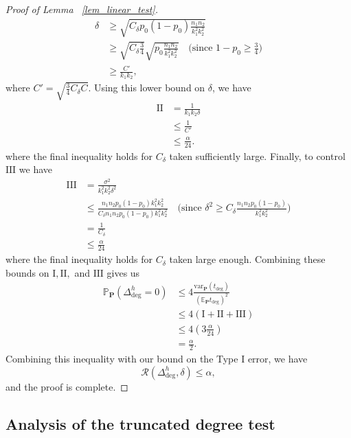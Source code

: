 \documentclass{article}
\newcommand{\bbP}{\mathbb{P}}
\newcommand{\bP}{\mathbf{P}}
\newcommand{\cR}{\mathcal{R}}
\newcommand{\EE}{\mathbb{E}}
\newcommand{\var}{\textrm{var}}
\newcommand{\lin}{\text{deg}}
\begin{document}
\begin{proof}[Proof of Lemma ~\ref{lem_linear_test}]
\begin{align*}
    \delta &\geq \sqrt{C_\delta p_0 (1 - p_0)\frac{n_1n_2}{k_1^2k_2^2}} \\
    &\geq \sqrt{C_\delta \frac 34}\sqrt{p_0\frac{n_1n_2}{k_1^2k_2^2}} \quad \text{(since $1 - p_0 \geq \frac34$)} \\
    &\geq \frac{C'}{k_1k_2},
\end{align*}
where $C' = \sqrt{\frac 34 C_\delta C}$. Using this lower bound on $\delta$, we have
\begin{align*}
    \text{II} &= \frac{1}{k_1k_2\delta} \\
    &\leq \frac{1}{C'} \\
    &\leq \frac{\alpha}{24}.
\end{align*}
where the final inequality holds for $C_\delta$ taken sufficiently large. Finally, to control $\text{III}$ we have
\begin{align*}
    \text{III} &= \frac{\sigma^2}{k^2_1k^2_2 \delta^2} \\
    &\leq \frac{n_1n_2p_0(1- p_0)k_1^2k_2^2}{C_\delta n_1n_2p_0(1- p_0)k_1^2k_2^2} \quad \text{(since $\delta^2 \geq C_\delta\frac{n_1n_2p_0(1 - p_0)}{k^2_1k^2_2}$)}\\
    &= \frac{1}{C_\delta} \\
    &\leq \frac{\alpha}{24}
\end{align*}
where the final inequality holds for $C_\delta$ taken large enough. Combining these bounds on $\text{I}, \text{II},$ and $\text{III}$ gives us
\begin{align*}
    \bbP_\bP(\Delta_\lin^h = 0) &\leq4\frac{\var_\bP(t_\lin)}{(\EE_\bP t_\lin)^2} \\
    &\leq 4(\text{I} + \text{II} + \text{III}) \\
    &\leq 4(3 \frac{\alpha}{24}) \\
    &= \frac{\alpha}{2}.
\end{align*}
Combining this inequality with our bound on the Type I error, we have
\[\cR(\Delta_\lin^h, \delta) \leq \alpha,\]
and the proof is complete.
\end{proof}

\subsection{Analysis of the truncated degree test}
\end{document}
